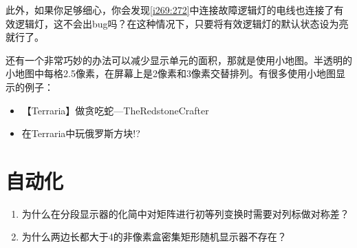 此外，如果你足够细心，你会发现\autoref{i269:272}中连接故障逻辑灯的电线也连接了有效逻辑灯，这不会出bug吗？在这种情况下，只要将有效逻辑灯的默认状态设为亮就行了。

还有一个非常巧妙的办法可以减少显示单元的面积，那就是使用小地图。半透明的小地图中每格2.5像素，在屏幕上是2像素和3像素交替排列。有很多使用小地图显示的例子：
\begin{itemize}
\item 【Terraria】做贪吃蛇—TheRedstoneCrafter 
\item 在Terraria中玩俄罗斯方块!? 
\end{itemize}

\section{自动化}

\begin{enumerate}
\item 为什么在分段显示器的化简中对矩阵进行初等列变换时需要对列标做对称差？
\item 为什么两边长都大于4的非像素盒密集矩形随机显示器不存在？
\end{enumerate}